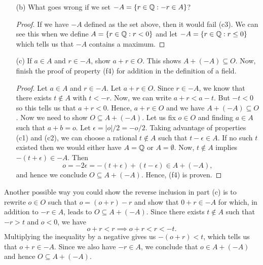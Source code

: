 \begin{enumerate}
\begin{proof}
        Finally, we show (c3). Suppose \( r \in -A  \). Then there exists \( t \notin A  \) such that \( -r > t  \). Multiplying through the inequality by a negative gives us \( r < -t  \) which is our desired result. Hence, \( -A  \) defines a cut.
        \end{proof}
    \item[(b)] What goes wrong if we set \( -A = \{ r \in \mathbb{Q} : -r \in A  \}  \)?
        \begin{proof}
        If we have \( -A  \) defined as the set above, then it would fail (c3). We can see this when we define \(  A = \{ r \in \mathbb{Q} : r < 0  \}  \) and let \( -A = \{ r \in \mathbb{Q} : r \leq  0 \}   \) which tells us that \( -A  \) contains a maximum.
        \end{proof}
    \item[(c)] If \( a \in A  \) and \( r \in -A  \), show \( a + r \in O  \). This shows \( A + (-A ) \subseteq O  \). Now, finish the proof of property (f4) for addition in the definition of a field.
        \begin{proof}
            Let \( a \in A  \) and \( r \in -A  \). Let \( a + r \in O  \). Since \( r \in -A  \), we know that there exists \( t \notin A  \) with \( t < -r  \). Now, we can write \( a + r < a - t    \). But \( -t < 0  \) so this tells us that \( a + r < 0  \). Hence, \( a + r \in O  \) and we have \( A + (-A) \subseteq O  \). Now we need to show \( O \subseteq A + (-A)  \). Let us fix \( o \in O  \) and finding \( a \in A  \) such that \( a + b = o  \). Let \( \epsilon  = | o | / 2 = -o / 2  \). Taking advantage of properties (c1) and (c2), we can choose a rational \( t \notin A  \) such that \( t - \epsilon \in A  \). If no such \( t  \) existed then we would either have \( A = \mathbb{Q}  \) or \( A = \emptyset \). Now, \( t \notin A   \) implies \( -(t+\epsilon ) \in -A  \). Then 
            \[ o = -2 \epsilon = -(t+\epsilon ) + (t-\epsilon ) \in A + (-A ), \] and hence we conclude \( O \subseteq A + (-A) \). Hence, (f4) is proven.
        \end{proof}
\end{enumerate}


\begin{remark}
   Another possible way you could show the reverse inclusion in part (c) is to rewrite \( o \in O  \) such that \( o = (o+r) - r  \) and show that \( 0+r  \in -A \) for which, in addition to \( -r \in A  \), leads to \( O \subseteq A + (-A ) \). Since there exists \( t \notin A  \) such that \( -r > t  \) and \( o < 0  \), we have 
   \[  o+r < r \implies o + r < r < -t.   \]
   Multiplying the inequality by a negative gives us \( -(o+r) < t  \), which tells us that \( o +r \in -A  \). Since we also have \( - r \in A   \), we conclude that \( o \in A + (-A )  \) and hence \( O \subseteq A + (-A) \).
\end{remark}


